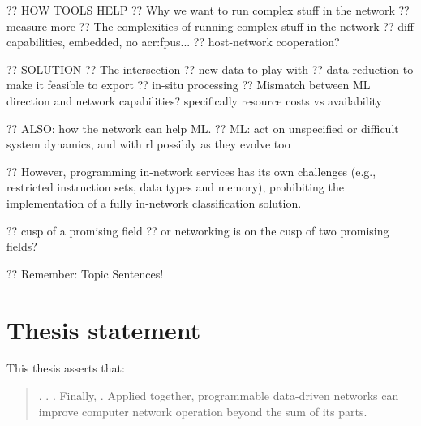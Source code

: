 ?? HOW TOOLS HELP
?? Why we want to run complex stuff in the network
?? measure more
?? The complexities of running complex stuff in the network
?? diff capabilities, embedded, no \glspl{acr:fpu}...
?? host-network cooperation?

?? SOLUTION
?? The intersection
?? new data to play with
?? data reduction to make it feasible to export
?? in-situ processing
?? Mismatch between ML direction and network capabilities? specifically resource costs vs availability

?? ALSO: how the network can help ML.
?? ML: act on unspecified or difficult system dynamics, and with rl possibly as they evolve too

?? However, programming in-network services has its own challenges (e.g., restricted instruction sets, data types and memory), prohibiting the implementation of a fully in-network classification solution.

?? cusp of a promising field
?? or networking is on the cusp of two promising fields?

?? Remember: Topic Sentences!

\section{Thesis statement}
This thesis asserts that:
\begin{quotation}
	\noindent
	.
	.
	.
	Finally, .
	Applied together, programmable data-driven networks can improve computer network operation beyond the sum of its parts.
\end{quotation}

